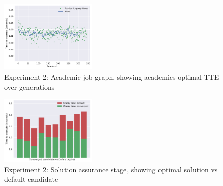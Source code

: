 \documentclass[a4paper,english]{report}
\begin{document}
	\begin{figure}[H]
		\centering
		\includegraphics[width=130pt]{runlogs/final7/3}
		\caption{Experiment 2: Academic job graph, showing academics optimal TTE over generations}
		\label{fig:final23}
	\end{figure}
	\begin{figure}[H]
		\centering
		\includegraphics[width=130pt]{runlogs/final7/4}
		\caption{Experiment 2: Solution assurance stage, showing optimal solution vs default candidate}
		\label{fig:final24}
	\end{figure}
	\clearpage
\end{document}
